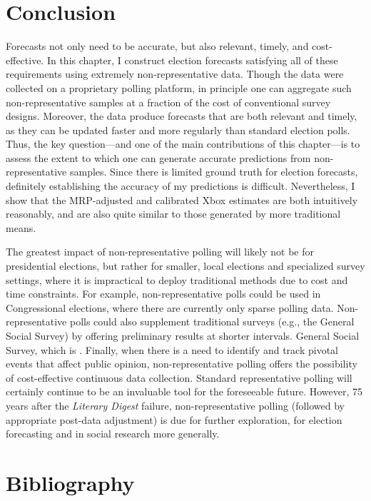 \section{Conclusion}\label{conclusion}

Forecasts not only need to be accurate, but also relevant, timely, and
cost-effective. In this chapter, I construct election forecasts
satisfying all of these requirements using extremely non-representative
data. Though the data were collected on a proprietary polling platform,
in principle one can aggregate such non-representative samples at a
fraction of the cost of conventional survey designs. Moreover, the data
produce forecasts that are both relevant and timely, as they can be
updated faster and more regularly than standard election polls. Thus,
the key question---and one of the main contributions of this
chapter---is to assess the extent to which one can generate accurate
predictions from non-representative samples. Since there is limited
ground truth for election forecasts, definitely establishing the
accuracy of my predictions is difficult. Nevertheless, I show that the
MRP-adjusted and calibrated Xbox estimates are both intuitively
reasonably, and are also quite similar to those generated by more
traditional means.

The greatest impact of non-representative polling will likely not be for
presidential elections, but rather for smaller, local elections and
specialized survey settings, where it is impractical to deploy
traditional methods due to cost and time constraints. For example,
non-representative polls could be used in Congressional elections, where
there are currently only sparse polling data. Non-representative polls
could also supplement traditional surveys (e.g., the General Social
Survey) by offering preliminary results at shorter intervals. General
Social Survey, which is . Finally, when there is a need to identify and
track pivotal events that affect public opinion, non-representative
polling offers the possibility of cost-effective continuous data
collection. Standard representative polling will certainly continue to
be an invaluable tool for the foreseeable future. However, 75 years
after the \textsl{Literary Digest} failure, non-representative polling
(followed by appropriate post-data adjustment) is due for further
exploration, for election forecasting and in social research more
generally.

\section*{Bibliography}\label{bibliography}

